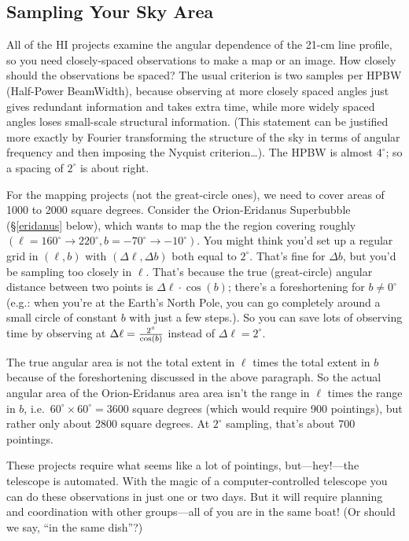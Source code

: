 \documentclass[psfig,preprint]{aastex}
\begin{document}
\subsection{Sampling Your Sky Area}
All of the HI projects examine the angular dependence of the 21-cm line
profile, so you need closely-spaced observations to make a map or an
image. How closely should the observations be spaced?  The usual
criterion is two samples per HPBW (Half-Power BeamWidth), because
observing at more closely spaced angles just gives redundant information
and takes extra time, while more widely spaced angles loses small-scale
structural information. (This statement can be justified more exactly by
Fourier transforming the structure of the sky in terms of angular
frequency and then imposing the Nyquist criterion\dots).  The HPBW is
almost $4^\circ$; so a spacing of $2^\circ$ is about right.

For the mapping projects (not the great-circle ones), we need to cover
areas of 1000 to 2000 square degrees. Consider the Orion-Eridanus
Superbubble (\S \ref{eridanus} below), which wants to map the the region
covering roughly $(\ell=160^\circ \rightarrow 220^\circ, b=-70^\circ
\rightarrow -10^\circ)$. You might think you'd set up a regular grid in
$(\ell,b)$ with $(\Delta \ell, \Delta b)$ both equal to
$2^\circ$. That's fine for $\Delta b$, but you'd be sampling too closely
in $\ell$. That's because the true (great-circle) angular distance
between two points is $\Delta \ell \cdot \cos(b)$; there's a
foreshortening for $b \neq 0^\circ$ (e.g.: when you're at the Earth's
North Pole, you can go completely around a small circle of constant $b$
with just a few steps.). So you can save lots of observing time by
observing at $\Delta \ell = {2^\circ \over \cos(b)}$ instead of $\Delta
\ell = 2^\circ$.

The true angular area is not the total extent in $\ell$ times the total
extent in $b$ because of the foreshortening discussed in the above
paragraph. So the actual angular area of the Orion-Eridanus area area
isn't the range in $\ell$ times the range in $b$, i.e.\ $60^\circ
\times 60^\circ = 3600$ square degrees (which would require 900
pointings), but rather only about 2800 square degrees.  At $2^\circ$
sampling, that's about 700 pointings.

These projects require what seems like a lot of pointings,
but---hey!---the telescope is automated. With the magic of a
computer-controlled telescope you can do these observations in just one
or two days. But it will require planning and coordination with other
groups---all of you are in the same boat! (Or should we say, ``in the
same dish''?)
\end{document}
